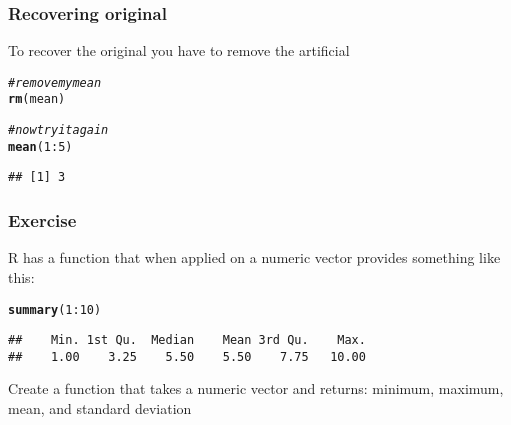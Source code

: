 \documentclass[12pt]{beamer}\usepackage[]{graphicx}\usepackage[]{color}
\makeatletter
\newcommand{\hlnum}[1]{\textcolor[rgb]{0.686,0.059,0.569}{#1}}%
\newcommand{\hlcom}[1]{\textcolor[rgb]{0.678,0.584,0.686}{\textit{#1}}}%
\newcommand{\hlopt}[1]{\textcolor[rgb]{0,0,0}{#1}}%
\newcommand{\hlstd}[1]{\textcolor[rgb]{0.345,0.345,0.345}{#1}}%
\newcommand{\hlkwd}[1]{\textcolor[rgb]{0.737,0.353,0.396}{\textbf{#1}}}%
\newenvironment{kframe}{%
 \def\at@end@of@kframe{}%
 \ifinner\ifhmode%
  \def\at@end@of@kframe{\end{minipage}}%
  \begin{minipage}{\columnwidth}%
 \fi\fi%
 \def\FrameCommand##1{\hskip\@totalleftmargin \hskip-\fboxsep
 \colorbox{shadecolor}{##1}\hskip-\fboxsep
     \hskip-\linewidth \hskip-\@totalleftmargin \hskip\columnwidth}%
 \MakeFramed {\advance\hsize-\width
   \@totalleftmargin\z@ \linewidth\hsize
   \@setminipage}}%
 {\par\unskip\endMakeFramed%
 \at@end@of@kframe}
\newenvironment{knitrout}{}{} %
\makeatother
\begin{document}

\begin{frame}[fragile]
\frametitle{Recovering original }

To recover the original  you have to remove the artificial 
\begin{knitrout}\footnotesize
{}\color{fgcolor}\begin{kframe}
\begin{alltt}
\hlcom{# remove my mean}
\hlkwd{rm}\hlstd{(mean)}

\hlcom{# now try it again}
\hlkwd{mean}\hlstd{(}\hlnum{1}\hlopt{:}\hlnum{5}\hlstd{)}
\end{alltt}
\begin{verbatim}
## [1] 3
\end{verbatim}
\end{kframe}
\end{knitrout}

\end{frame}


\begin{frame}
\begin{center}
\Huge{}
\end{center}
\end{frame}


\begin{frame}[fragile]
\frametitle{Exercise}

R has a function  that when applied on a numeric vector provides something like this:
\begin{knitrout}\footnotesize
{}\color{fgcolor}\begin{kframe}
\begin{alltt}
\hlkwd{summary}\hlstd{(}\hlnum{1}\hlopt{:}\hlnum{10}\hlstd{)}
\end{alltt}
\begin{verbatim}
##    Min. 1st Qu.  Median    Mean 3rd Qu.    Max. 
##    1.00    3.25    5.50    5.50    7.75   10.00
\end{verbatim}
\end{kframe}
\end{knitrout}

Create a  function that takes a numeric vector and returns: minimum, maximum, mean, and standard deviation

\end{frame}
\end{document}
